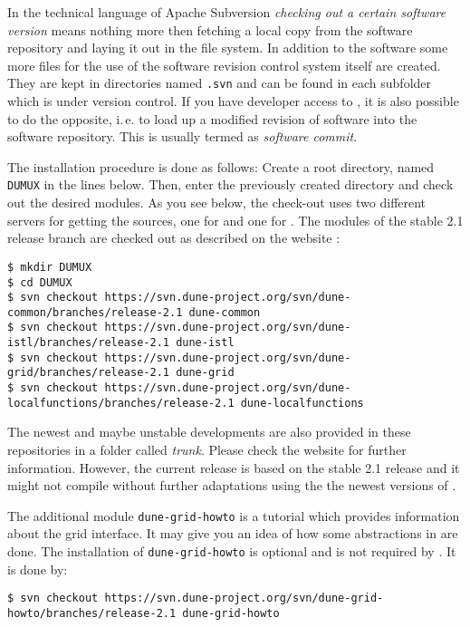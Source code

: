 In the technical language of Apache Subversion \emph{checking out a certain software version} means nothing more then fetching 
a local copy from the software repository and laying it out in the file system.  In addition to the software some more files for the use of the software revision control system itself are created. They are kept in directories named \texttt{.svn} and can be found in each subfolder which is under version control.
If you have developer access to \Dumux, it is also possible to do the opposite, i.\,e. to load up a modified revision of software into the software repository. This is usually termed as \emph{software commit}.

The installation procedure is done as follows:
Create a  {\Dune} root directory, named \texttt{DUMUX} in the lines below.
Then, enter the previously created directory and check out the desired modules. 
As you see below, the check-out uses two different servers for getting the sources, one for \Dune and one for {\Dumux}.
The \Dune modules of the stable 2.1 release branch are checked out as described on the \Dune website \cite{DUNE-DOWNLOAD-SVN}:

\begin{lstlisting}[style=Bash]
$ mkdir DUMUX
$ cd DUMUX
$ svn checkout https://svn.dune-project.org/svn/dune-common/branches/release-2.1 dune-common
$ svn checkout https://svn.dune-project.org/svn/dune-istl/branches/release-2.1 dune-istl
$ svn checkout https://svn.dune-project.org/svn/dune-grid/branches/release-2.1 dune-grid
$ svn checkout https://svn.dune-project.org/svn/dune-localfunctions/branches/release-2.1 dune-localfunctions
\end{lstlisting}

The newest and maybe unstable developments are also provided in these repositories in a folder called \emph{trunk}. Please check the \Dune website \cite{DUNE-DOWNLOAD-SVN} for further information. However, the current \Dumux release is based on the stable 2.1 release and it might not compile without further adaptations using the the newest versions of \Dune.

The additional module \texttt{dune-grid-howto} is a tutorial which provides information about the \Dune grid interface.
It may give you an idea of how some abstractions in \Dune are done.
The installation of \texttt{dune-grid-howto} is optional and is not required by \Dumux. It is done by: 

\begin{lstlisting}[style=Bash]
$ svn checkout https://svn.dune-project.org/svn/dune-grid-howto/branches/release-2.1 dune-grid-howto
\end{lstlisting}


